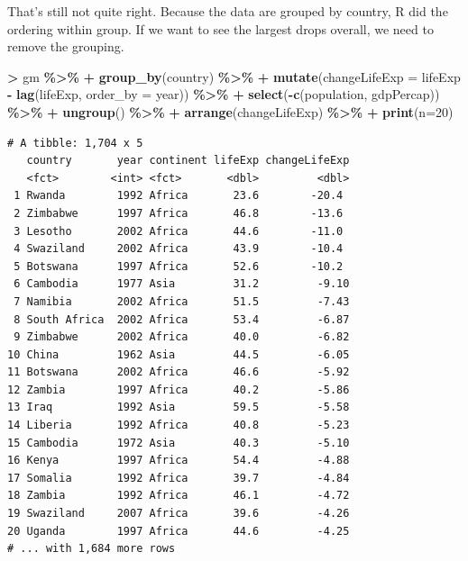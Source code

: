\documentclass[
]{krantz}
\makeatletter
\newenvironment{Shaded}{\begin{snugshade}}{\end{snugshade}}
\newcommand{\DataTypeTok}[1]{\textcolor[rgb]{0.27,0.27,0.27}{#1}}
\newcommand{\DecValTok}[1]{\textcolor[rgb]{0.06,0.06,0.06}{#1}}
\newcommand{\KeywordTok}[1]{\textcolor[rgb]{0.27,0.27,0.27}{\textbf{#1}}}
\newcommand{\NormalTok}[1]{#1}
\newcommand{\OperatorTok}[1]{\textcolor[rgb]{0.43,0.43,0.43}{\textbf{#1}}}
\newcommand{\StringTok}[1]{\textcolor[rgb]{0.5,0.5,0.5}{#1}}
\newenvironment{kframe}{%
\medskip{}
\setlength{\fboxsep}{.8em}
 \def\at@end@of@kframe{}%
 \ifinner\ifhmode%
  \def\at@end@of@kframe{\end{minipage}}%
  \begin{minipage}{\columnwidth}%
 \fi\fi%
 \def\FrameCommand##1{\hskip\@totalleftmargin \hskip-\fboxsep
 \colorbox{shadecolor}{##1}\hskip-\fboxsep
     \hskip-\linewidth \hskip-\@totalleftmargin \hskip\columnwidth}%
 \MakeFramed {\advance\hsize-\width
   \@totalleftmargin\z@ \linewidth\hsize
   \@setminipage}}%
 {\par\unskip\endMakeFramed%
 \at@end@of@kframe}
\renewenvironment{Shaded}{\begin{kframe}}{\end{kframe}}
\makeatother
\begin{document}
That's still not quite right. Because the data are grouped by country, R did the ordering within group. If we want to see the largest drops overall, we need to remove the grouping.

\begin{Shaded}
\begin{Highlighting}[]
\OperatorTok{\textgreater{}}\StringTok{ }\NormalTok{gm }\OperatorTok{\%\textgreater{}\%}\StringTok{ }
\OperatorTok{+}\StringTok{   }\KeywordTok{group\_by}\NormalTok{(country) }\OperatorTok{\%\textgreater{}\%}\StringTok{ }
\OperatorTok{+}\StringTok{   }\KeywordTok{mutate}\NormalTok{(}\DataTypeTok{changeLifeExp =}\NormalTok{ lifeExp }\OperatorTok{{-}}\StringTok{ }\KeywordTok{lag}\NormalTok{(lifeExp, }\DataTypeTok{order\_by =}\NormalTok{ year)) }\OperatorTok{\%\textgreater{}\%}\StringTok{ }
\OperatorTok{+}\StringTok{   }\KeywordTok{select}\NormalTok{(}\OperatorTok{{-}}\KeywordTok{c}\NormalTok{(population, gdpPercap)) }\OperatorTok{\%\textgreater{}\%}\StringTok{ }
\OperatorTok{+}\StringTok{   }\KeywordTok{ungroup}\NormalTok{() }\OperatorTok{\%\textgreater{}\%}\StringTok{ }
\OperatorTok{+}\StringTok{   }\KeywordTok{arrange}\NormalTok{(changeLifeExp) }\OperatorTok{\%\textgreater{}\%}\StringTok{ }
\OperatorTok{+}\StringTok{   }\KeywordTok{print}\NormalTok{(}\DataTypeTok{n=}\DecValTok{20}\NormalTok{)}
\end{Highlighting}
\end{Shaded}

\begin{verbatim}
# A tibble: 1,704 x 5
   country       year continent lifeExp changeLifeExp
   <fct>        <int> <fct>       <dbl>         <dbl>
 1 Rwanda        1992 Africa       23.6        -20.4 
 2 Zimbabwe      1997 Africa       46.8        -13.6 
 3 Lesotho       2002 Africa       44.6        -11.0 
 4 Swaziland     2002 Africa       43.9        -10.4 
 5 Botswana      1997 Africa       52.6        -10.2 
 6 Cambodia      1977 Asia         31.2         -9.10
 7 Namibia       2002 Africa       51.5         -7.43
 8 South Africa  2002 Africa       53.4         -6.87
 9 Zimbabwe      2002 Africa       40.0         -6.82
10 China         1962 Asia         44.5         -6.05
11 Botswana      2002 Africa       46.6         -5.92
12 Zambia        1997 Africa       40.2         -5.86
13 Iraq          1992 Asia         59.5         -5.58
14 Liberia       1992 Africa       40.8         -5.23
15 Cambodia      1972 Asia         40.3         -5.10
16 Kenya         1997 Africa       54.4         -4.88
17 Somalia       1992 Africa       39.7         -4.84
18 Zambia        1992 Africa       46.1         -4.72
19 Swaziland     2007 Africa       39.6         -4.26
20 Uganda        1997 Africa       44.6         -4.25
# ... with 1,684 more rows
\end{verbatim}
\end{document}
